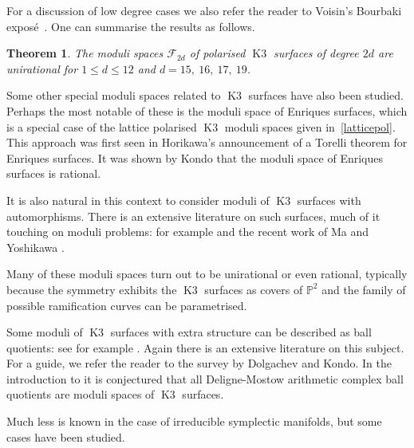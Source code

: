 \documentclass[a4paper,11pt]{article}
\newtheorem{theorem}[lemma]{Theorem}
\newcommand{\PP}{\mathbb P}
\newcommand{\cF}{\mathcal F}
\newcommand{\Kthree}{\mathop{\mathrm {K3}}\nolimits}
\begin{document}
For a discussion of low degree cases we also refer the reader to
Voisin's Bourbaki expos\'e~\cite{Vo2}. One can summarise the results
as follows.
\begin{theorem}\label{thm:lowdegree}
The moduli spaces $\cF_{2d}$ of polarised $\Kthree$ surfaces of degree
$2d$ are unirational for $1 \leq d \leq 12$ and $d=15,\ 16,\ 17,\ 19$.
\end{theorem}

Some other special moduli spaces related to $\Kthree$ surfaces have
also been studied. Perhaps the most notable of these is the moduli
space of Enriques surfaces, which is a special case of the lattice
polarised $\Kthree$ moduli spaces given in~\eqref{latticepol}. This
approach was first seen in Horikawa's announcement \cite{HorEnr} of a
Torelli theorem for Enriques surfaces. It was shown by Kondo
\cite{KoEnr} that the moduli space of Enriques surfaces is rational.

It is also natural in this context to consider moduli of $\Kthree$
surfaces with automorphisms. There is an extensive literature on such
surfaces, much of it touching on moduli problems: for example \cite{GaS}
and the recent work of Ma and Yoshikawa \cite{MY}. 

Many of these moduli spaces turn out to be unirational or even
rational, typically because the symmetry exhibits the $\Kthree$
surfaces as covers of $\PP^2$ and the family of possible ramification curves can
be parametrised.

Some moduli of $\Kthree$ surfaces with extra structure can be
described as ball quotients: see for example \cite{DGK}.  Again there
is an extensive literature on this subject. For a guide, we refer the
reader to the survey \cite{DK} by Dolgachev and Kondo. In the
introduction to \cite{DK} it is conjectured that all Deligne-Mostow
arithmetic complex ball quotients are moduli spaces of $\Kthree$
surfaces.

Much less is known in the case of irreducible symplectic manifolds,
but some cases have been studied.
\end{document}
